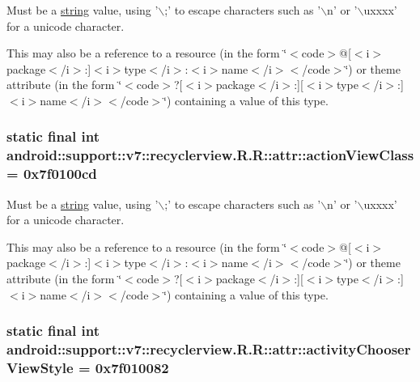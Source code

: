 Must be a \hyperlink{classandroid_1_1support_1_1v7_1_1recyclerview_1_1_r_1_1string}{string} value, using '$\backslash$;' to escape characters such as '$\backslash$n' or '$\backslash$uxxxx' for a unicode character. 

This may also be a reference to a resource (in the form \char`\"{}$<$code$>$@\mbox{[}$<$i$>$package$<$/i$>$:\mbox{]}$<$i$>$type$<$/i$>$:$<$i$>$name$<$/i$>$$<$/code$>$\char`\"{}) or theme attribute (in the form \char`\"{}$<$code$>$?\mbox{[}$<$i$>$package$<$/i$>$:\mbox{]}\mbox{[}$<$i$>$type$<$/i$>$:\mbox{]}$<$i$>$name$<$/i$>$$<$/code$>$\char`\"{}) containing a value of this type. \hypertarget{classandroid_1_1support_1_1v7_1_1recyclerview_1_1_r_1_1attr_ef64f23d49185f31751138d25ec3a17d}{
\subsubsection[{actionViewClass}]{\setlength{\rightskip}{0pt plus 5cm}static final int android::support::v7::recyclerview.R.R::attr::actionViewClass = 0x7f0100cd}}
\label{classandroid_1_1support_1_1v7_1_1recyclerview_1_1_r_1_1attr_ef64f23d49185f31751138d25ec3a17d}


Must be a \hyperlink{classandroid_1_1support_1_1v7_1_1recyclerview_1_1_r_1_1string}{string} value, using '$\backslash$;' to escape characters such as '$\backslash$n' or '$\backslash$uxxxx' for a unicode character. 

This may also be a reference to a resource (in the form \char`\"{}$<$code$>$@\mbox{[}$<$i$>$package$<$/i$>$:\mbox{]}$<$i$>$type$<$/i$>$:$<$i$>$name$<$/i$>$$<$/code$>$\char`\"{}) or theme attribute (in the form \char`\"{}$<$code$>$?\mbox{[}$<$i$>$package$<$/i$>$:\mbox{]}\mbox{[}$<$i$>$type$<$/i$>$:\mbox{]}$<$i$>$name$<$/i$>$$<$/code$>$\char`\"{}) containing a value of this type. \hypertarget{classandroid_1_1support_1_1v7_1_1recyclerview_1_1_r_1_1attr_09bf580bc55e9dfd9aaf6069c7b318b6}{
\subsubsection[{activityChooserViewStyle}]{\setlength{\rightskip}{0pt plus 5cm}static final int android::support::v7::recyclerview.R.R::attr::activityChooserViewStyle = 0x7f010082}}
\label{classandroid_1_1support_1_1v7_1_1recyclerview_1_1_r_1_1attr_09bf580bc55e9dfd9aaf6069c7b318b6}


